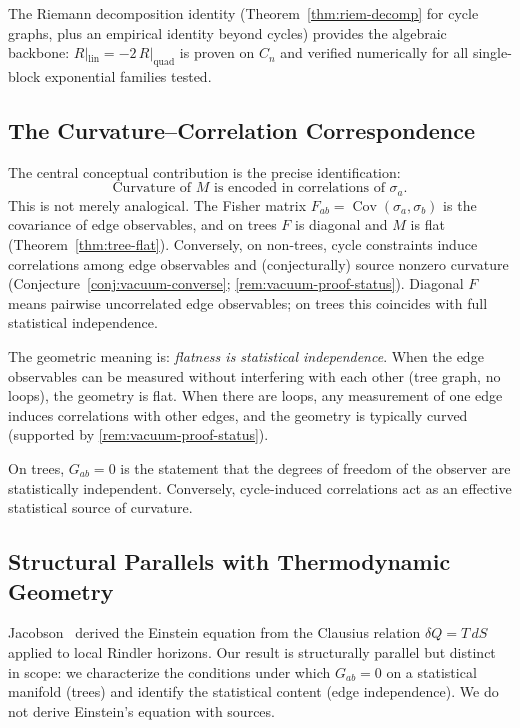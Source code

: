 \documentclass[11pt]{article}
\theoremstyle{definition}
\theoremstyle{remark}
\newcommand{\Fish}{F}
\newcommand{\Met}{M}
\newcommand{\Cov}{\operatorname{Cov}}
\newcommand{\edgeo}{\sigma}
\newcommand{\Ein}{G}
\newcommand{\Riem}{R}
\begin{document}
The Riemann decomposition identity
(Theorem~\ref{thm:riem-decomp} for cycle graphs, plus an empirical
identity beyond cycles) provides the algebraic backbone:
$\Riem|_{\mathrm{lin}} = -2\,\Riem|_{\mathrm{quad}}$ is proven on $C_n$
and verified numerically for all single-block exponential families tested.

\subsection{The Curvature--Correlation Correspondence}

The central conceptual contribution is the precise identification:
\begin{equation}
  \boxed{\text{Curvature of } \Met \text{ is encoded in correlations of } \edgeo_a.}
  \label{eq:curvature-correlations}
\end{equation}
This is not merely analogical. The Fisher matrix $\Fish_{ab} = \Cov(\edgeo_a, \edgeo_b)$
is the covariance of edge observables, and on trees $\Fish$ is diagonal and
$\Met$ is flat (Theorem~\ref{thm:tree-flat}).
Conversely, on non-trees, cycle constraints induce correlations among edge
observables and (conjecturally) source nonzero curvature
(Conjecture~\ref{conj:vacuum-converse}; \cref{rem:vacuum-proof-status}).
Diagonal $\Fish$ means pairwise uncorrelated edge observables; on trees
this coincides with full statistical independence.

The geometric meaning is: \emph{flatness is statistical independence}.
When the edge observables can be measured without interfering with each other
(tree graph, no loops), the geometry is flat. When there are loops, any
measurement of one edge induces correlations with other edges, and the
geometry is typically curved (supported by \cref{rem:vacuum-proof-status}).

On trees, $\Ein_{ab} = 0$ is the statement that the
degrees of freedom of the observer are statistically independent.
Conversely, cycle-induced correlations act as an effective statistical
source of curvature.

\subsection{Structural Parallels with Thermodynamic Geometry}

Jacobson~\cite{Jacobson1995} derived the Einstein equation from the
Clausius relation $\delta Q = T\, dS$ applied to local Rindler horizons.
Our result is structurally parallel but distinct in scope: we characterize
the conditions under which $\Ein_{ab} = 0$ on a statistical manifold
(trees) and identify the statistical content (edge independence).
We do not derive Einstein's equation with sources.
\end{document}
